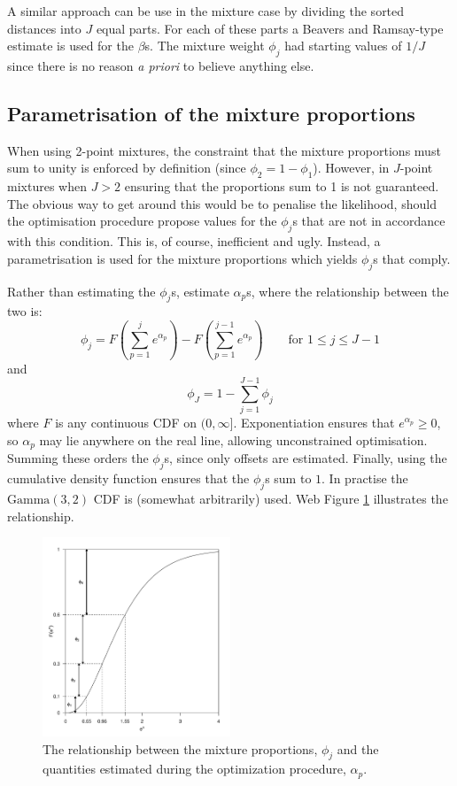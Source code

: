 \documentclass{report}
\begin{document}
A similar approach can be use in the mixture case by dividing the sorted distances into $J$ equal parts. For each of these parts a Beavers and Ramsay-type estimate is used for the $\beta$s. The mixture weight $\phi_j$ had starting values of $1/J$ since there is no reason \textit{a priori} to believe anything else.

\subsection*{Parametrisation of the mixture proportions}

When using 2-point mixtures, the constraint that the mixture proportions must sum to unity is enforced by definition (since $\phi_2=1-\phi_1$). However, in $J$-point mixtures when $J>2$ ensuring that the proportions sum to 1 is not guaranteed. The obvious way to get around this would be to penalise the likelihood, should the optimisation procedure propose values for the $\phi_j$s that are not in accordance with this condition. This is, of course, inefficient and ugly. Instead, a parametrisation is used for the mixture proportions which yields $\phi_j$s that comply.

Rather than estimating the $\phi_j$s, estimate $\alpha_p$s, where the relationship between the two is:
\begin{equation*}
\phi_j = F(\sum_{p=1}^j e^{\alpha_p}) - F(\sum_{p=1}^{j-1} e^{\alpha_p}) \qquad \text{for } 1\leq j \leq J-1
\end{equation*}
and
\begin{equation*}
\phi_J = 1-\sum_{j=1}^{J-1} \phi_j
\end{equation*}
where $F$ is any continuous CDF on $(0,\infty]$. Exponentiation ensures that $e^{\alpha_p}\geq0$, so $\alpha_p$ may lie anywhere on the real line, allowing unconstrained optimisation. Summing these orders the $\phi_j$s, since only offsets are estimated. Finally, using the cumulative density function ensures that the $\phi_j$s sum to $1$. In practise the $\text{Gamma}(3,2)$ CDF is (somewhat arbitrarily) used. Web Figure \ref{mmds-phifig} illustrates the relationship.

\begin{figure}
\centering
\includegraphics[width=0.5\textwidth]{figs/phidia.pdf}
\caption{The relationship between the mixture proportions, $\phi_j$ and the quantities estimated during the optimization procedure, $\alpha_p$.}
\label{mmds-phifig}
\end{figure}
\end{document}

